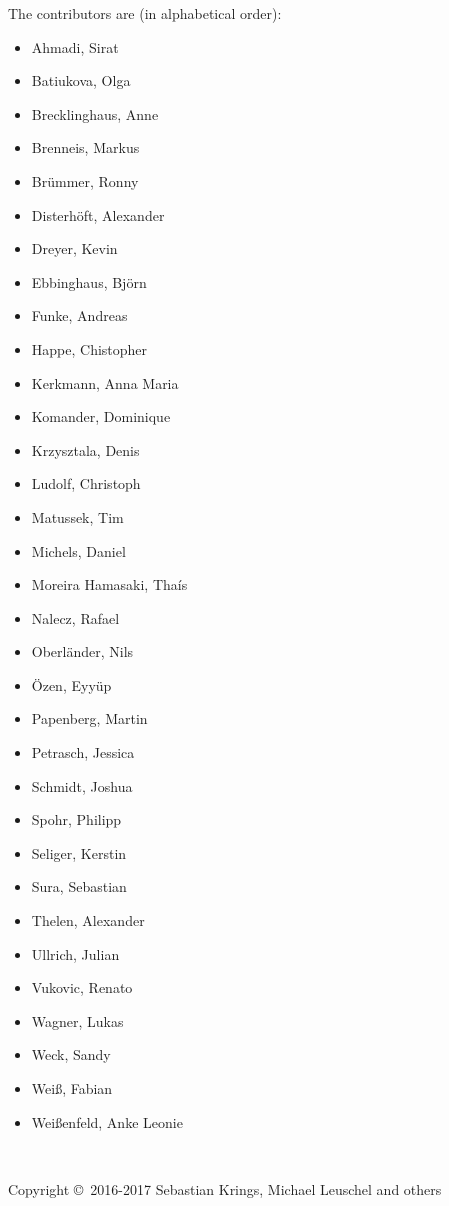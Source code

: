 \documentclass[11pt,oneside]{book} %
\begin{document}
\noindent
The contributors are (in alphabetical order):
\begin{itemize}
    \item Ahmadi, Sirat
    \item Batiukova, Olga
    \item Brecklinghaus, Anne
    \item Brenneis, Markus
    \item Brümmer, Ronny
    \item Disterhöft, Alexander
    \item Dreyer, Kevin
    \item Ebbinghaus, Björn
    \item Funke, Andreas
    \item Happe, Chistopher
    \item Kerkmann, Anna Maria
    \item Komander, Dominique
    \item Krzysztala, Denis
    \item Ludolf, Christoph
    \item Matussek, Tim
    \item Michels, Daniel
    \item Moreira Hamasaki, Thaís
    \item Nalecz, Rafael
    \item Oberländer, Nils
    \item Özen, Eyyüp
    \item Papenberg, Martin
    \item Petrasch, Jessica
    \item Schmidt, Joshua
    \item Spohr, Philipp
    \item Seliger, Kerstin
    \item Sura, Sebastian
    \item Thelen, Alexander
    \item Ullrich, Julian
    \item Vukovic, Renato
    \item Wagner, Lukas
    \item Weck, Sandy
    \item Weiß, Fabian
    \item Weißenfeld, Anke Leonie
\end{itemize}

~\vfill

\noindent Copyright \copyright\ 2016-2017 Sebastian Krings, Michael Leuschel and others\\ %
\end{document}
